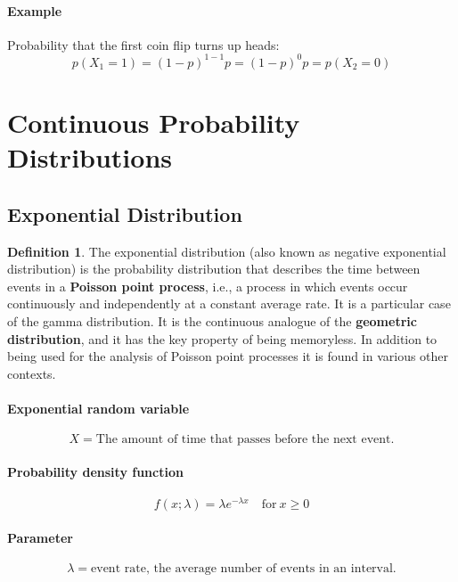 \documentclass[12pt]{article}
\theoremstyle{plain}
\theoremstyle{definition}
\newtheorem{definition}{Definition}
\theoremstyle{remark}
\begin{document}
\paragraph{Example}

Probability that the first coin flip turns up heads:
\begin{equation*}
  p(X_1=1) = (1-p)^{1-1}p = (1-p)^0p = p(X_2=0)
\end{equation*}

\section{Continuous Probability Distributions}

\subsection{Exponential Distribution}

\begin{definition}
  The exponential distribution (also known as negative exponential distribution)
  is the probability distribution that describes the time between events in a
  \textbf{Poisson point process}, i.e., a process in which events occur
  continuously and independently at a constant average rate.
  It is a particular case of the gamma distribution.
  It is the continuous analogue of the \textbf{geometric distribution}, and it
  has the key property of being memoryless.
  In addition to being used for the analysis of Poisson point processes it is
  found in various other contexts.
\end{definition}

\paragraph{Exponential random variable}
\begin{equation*}
  X = \text{The amount of time that passes before the next event.}
\end{equation*}

\paragraph{Probability density function}
\begin{equation*}
  f(x;\lambda) = \lambda e^{-\lambda x}\quad \text{for}\ x \geq 0
\end{equation*}

\paragraph{Parameter}
\begin{equation*}
  \lambda = \text{event rate, the average number of events in an interval.}
\end{equation*}
\end{document}
